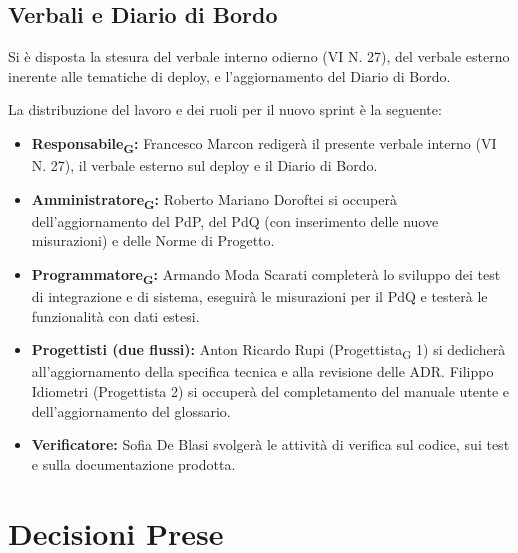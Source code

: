 \subsection{Verbali e Diario di Bordo}

Si è disposta la stesura del verbale interno odierno (VI N. 27), del verbale esterno inerente alle tematiche di deploy, e l'aggiornamento del Diario di Bordo.



\vspace{0.3cm}

La distribuzione del lavoro e dei ruoli per il nuovo sprint è la seguente:

\begin{itemize}

\item \textbf{Responsabile\textsubscript{G}:} Francesco Marcon redigerà il presente verbale interno (VI N. 27), il verbale esterno sul deploy e il Diario di Bordo.

\item \textbf{Amministratore\textsubscript{G}:} Roberto Mariano Doroftei si occuperà dell'aggiornamento del PdP, del PdQ (con inserimento delle nuove misurazioni) e delle Norme di Progetto.

\item \textbf{Programmatore\textsubscript{G}:} Armando Moda Scarati completerà lo sviluppo dei test di integrazione e di sistema, eseguirà le misurazioni per il PdQ e testerà le funzionalità con dati estesi.

\item \textbf{Progettisti (due flussi):} Anton Ricardo Rupi (Progettista\textsubscript{G} 1) si dedicherà all'aggiornamento della specifica tecnica e alla revisione delle ADR. Filippo Idiometri (Progettista 2) si occuperà del completamento del manuale utente e dell'aggiornamento del glossario.

\item \textbf{Verificatore:} Sofia De Blasi svolgerà le attività di verifica sul codice, sui test e sulla documentazione prodotta.

\end{itemize}



\section{Decisioni Prese}


\renewcommand{\arraystretch}{1.3}

